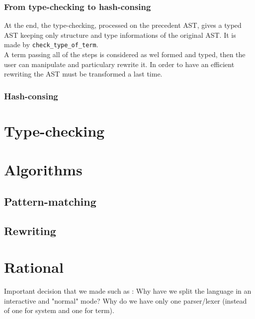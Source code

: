 \documentclass[12pt,a4paper]{article}
\begin{document}
\subsubsection{From type-checking to hash-consing}
At the end, the type-checking, processed on the precedent AST, gives a
typed AST keeping only structure and type informations of the original AST.
It is made by \verb?check_type_of_term?.
\\
A term passing all of the steps is considered as wel formed and typed, then
the user can manipulate and particulary rewrite it. In order to have an
efficient rewriting the AST must be transformed a last time.

\subsubsection{Hash-consing}


\section{Type-checking}

\section{Algorithms}

\subsection{Pattern-matching}

\subsection{Rewriting}

\section{Rational}
Important decision that we made such as : Why have we split the language in an interactive and "normal" mode? Why do we have only one parser/lexer (instead of one for system and one for term).
\end{document}

